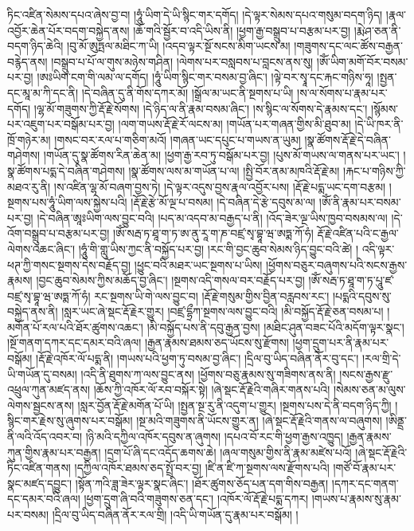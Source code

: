 ཏིང་འཛིན་སེམས་དཔའ་ཞེས་བྱ་བ། །ཧཱུཾ་ཡིག་དེ་ཡི་སྙིང་གར་དགོད། །དེ་ལྟར་སེམས་དཔའ་གསུམ་བདག་ཉིད། །རྣལ་འབྱོར་ཆེན་པོར་བདག་བསྐྱེད་ནས། །ཆོ་གའི་སྦྱོར་བ་འདི་ཡིས་ནི། །ཕྱག་རྒྱ་བསྒྲུབ་པ་བརྩམ་པར་བྱ། །རྨེ་ཤ་ཅན་ནི་བདག་ཉིད་ཆེའི། །བུ་མོ་ཨུཏྤལ་མཐིང་ཀ་ཡི། །འདབ་ལྟར་སྔོ་སངས་མིག་ཡངས་མ། །གཟུགས་དང་ལང་ཚོས་བརྒྱན་བརྙེད་ནས། །བསྒྲུབ་པ་པོ་ལ་གུས་མཉེས་གཤིན། །ལེགས་པར་བསླབས་པ་བླངས་ནས་སུ། །ཨོཾ་ཡིག་མགོ་བོར་བསམ་པར་བྱ། །ཨཿཡིག་ངག་གི་ལམ་ལ་དགོད། །ཧཱུཾ་ཡིག་སྙིང་གར་བསམ་བྱ་ཞིང་། །ལྟེ་བར་སྭཱ་དང་རྐང་གཉིས་ཧཱ། །སྤྱན་དང་མཱ་མ་ཀི་དང་ནི། །དེ་བཞིན་དུ་ནི་གོས་དཀར་མོ། །སྒྲོལ་མ་ཡང་ནི་སྔགས་པ་ཡི། །ས་ལ་སོགས་པ་རྣམ་པར་དགོད། །ལྷ་མོ་གཟུགས་ཀྱི་རྡོ་རྗེ་སོགས། །དེ་ཉིད་ལ་ནི་རྣམ་བསམ་ཞིང་། །ས་སྙིང་ལ་སོགས་དེ་རྣམས་དང་། །སྙོམས་པར་འཇུག་པར་བསྒོམ་པར་བྱ། །ལག་གཡས་རྡོ་རྗེ་རོ་ལངས་མ། །གཡོན་པར་གཞན་གྱིས་མི་ཐུབ་མ། །དེ་ཡི་ཁར་ནི་ཁྲོ་གཉེར་མ། །གསང་བར་རལ་པ་གཅིག་མའོ། །གཞན་ཡང་དཔུང་པ་གཡས་ན་ཡུམ། །སྣ་ཚོགས་རྡོ་རྗེ་དེ་བཞིན་གཤེགས། །གཡོན་དུ་སྣ་ཚོགས་རིན་ཆེན་མ། །ཕྱག་རྒྱ་རབ་ཏུ་བསྒོམ་པར་བྱ། །པུས་མོ་གཡས་ལ་གནས་པར་ཡང་། །སྣ་ཚོགས་པདྨ་དེ་བཞིན་གཤེགས། །སྣ་ཚོགས་ལས་མ་གཡོན་པ་ལ། །སྤྱི་བོར་ནམ་མཁའི་རྡོ་རྗེ་མ། །རྐང་པ་གཉིས་ཀྱི་མཐའ་རུ་ནི། །ས་འཛིན་ལྷ་མོ་བཞག་བྱས་ཏེ། །དེ་ལྟར་འདུས་བྱས་རྣལ་འབྱོར་པས། །རྡོ་རྗེ་པདྨ་ཡང་དག་བརྩམ། །སྔགས་པས་ཧཱུཾ་ཡིག་ལས་སྐྱེས་པའི། །རྡོ་རྗེ་རྩེ་མོ་ལྔ་པ་བསམ། །དེ་བཞིན་དེ་རྩེ་དབུས་མ་ལ། །ཨོཾ་ནི་རྣམ་པར་བསམ་པར་བྱ། །དེ་བཞིན་ཨཱཿཡིག་ལས་བྱུང་བའི། །པད་མ་འདབ་མ་བརྒྱད་པ་ནི། །འོད་ཟེར་ལྔ་ཡིས་ཁྱབ་བསམས་ལ། །དེ་འོག་བསྒྲུབ་པ་བརྩམ་པར་བྱ། །ཨོཾ་སརྦ་ཏ་ཐཱ་ག་ཏ་ཨ་ནུ་རཱ་ག་ཎ་བཛྲ་སྭ་བྷཱ་ཝ་ཨཏྨ་ཀོ་ཧཾ། རྡོ་རྗེ་འཛིན་པའི་ང་རྒྱལ་ལེགས་འཆང་ཞིང་། །ཧཱུཾ་གི་གླུ་ཡིས་ཀྱང་ནི་བསྐྱོད་པར་བྱ། །རང་གི་བྱང་ཆུབ་སེམས་ཉིད་བྱུང་བའི་ཚེ། །
འདི་ལྟར་ཕཊ་ཀྱི་གསང་སྔགས་དེས་བརྗོད་བྱ། །ཕྱུང་བའི་མཐར་ཡང་སྔགས་པ་ཡིས། །ཕྱོགས་བཅུར་བཞུགས་པའི་སངས་རྒྱས་རྣམས། །བྱང་ཆུབ་སེམས་ཀྱིས་མཆོད་བྱ་ཞིང་། །སྔགས་འདི་གསལ་བར་བརྗོད་པར་བྱ། །ཨོཾ་སརྦ་ཏ་ཐཱ་ག་ཏ་པཱུ་ཛ་བཛྲ་སྭ་བྷཱ་ཝ་ཨཏྨ་ཀོ་ཧཾ། རང་སྔགས་ཡི་གེ་ལས་བྱུང་བ། །རྡོ་རྗེ་གསུམ་གྱིས་བྱིན་བརླབས་རང་། །པདྨའི་དབུས་སུ་བསྐྱེད་ནས་ནི། །སླར་ཡང་ཞེ་སྡང་རྡོ་རྗེར་གྱུར། །བཛྲ་དྷྲྀཀ་སྔགས་ལས་བྱུང་བའི། །མི་བསྐྱོད་རྡོ་རྗེ་ཅན་བསམ་པ། །མགོན་པོ་རལ་པའི་ཐོར་ཚུགས་འཆང་། །མི་བསྐྱོད་པས་ནི་དབུ་རྒྱན་བྱས། །མཐིང་ཤུན་བཟང་པོའི་མདོག་ལྟར་སྣང་། །སྔོ་གནག་དཀར་དང་དམར་བའི་ཞལ། །རྒྱན་རྣམས་ཐམས་ཅད་ཡོངས་སུ་རྫོགས། །ཕྱག་དྲུག་པར་ནི་རྣམ་པར་བསྒོམ། །རྡོ་རྗེ་འཁོར་ལོ་པདྨ་ནི། །གཡས་པའི་ཕྱག་ཏུ་བསམ་བྱ་ཞིང་། །དྲིལ་བུ་ཡིད་བཞིན་ནོར་བུ་དང་། །རལ་གྲི་དེ་ཡི་གཡོན་དུ་བསམ། །འདི་ནི་ཐུགས་ཀ་ལས་བྱུང་ནས། །ཕྱོགས་བཅུ་རྣམས་སུ་གཟིགས་ནས་ནི། །སངས་རྒྱས་རྫུ་འཕྲུལ་ཀུན་མཛད་ནས། །ཆོས་ཀྱི་འཁོར་ལོ་རབ་བསྐོར་སྟེ། །ཞེ་སྡང་རྡོ་རྗེའི་གཞིར་གནས་པའི། །སེམས་ཅན་མ་ལུས་ལེགས་སྦྱངས་ནས། །སླར་བྱོན་རྡོ་རྗེ་མགོན་པོ་ཡི། །སྤྱན་སྔ་རུ་ནི་འདུག་པ་གྱུར། །སྔགས་པས་དེ་ནི་བདག་ཉིད་ཀྱི། །སྙིང་གར་རྗེས་སུ་ཞུགས་པར་བསྒོམ། །སྔ་མའི་གཟུགས་ནི་ཡོངས་གྱུར་ན། །ཞེ་སྡང་རྡོ་རྗེའི་གནས་ལ་བཞུགས། །ཨིནྡྲ་ནི་ལའི་འོད་འབར་བ། །ཉི་མའི་དཀྱིལ་འཁོར་དབུས་ན་ཞུགས། །དཔའ་བོ་རང་གི་ཕྱག་རྒྱས་འཁྱུད། །རྒྱན་རྣམས་ཀུན་གྱིས་རྣམ་པར་བརྒྱན། །དྲག་པོ་ཞི་དང་འདོད་ཆགས་ཆེ། །ཞལ་གསུམ་གྱིས་ནི་རྣམ་མཛེས་པའོ། །ཞེ་སྡང་རྡོ་རྗེའི་ཏིང་འཛིན་གནས། །དཀྱིལ་འཁོར་ཐམས་ཅད་སྤྲོ་བར་བྱ། །ཛི་ན་ཛི་ཀ་སྔགས་ལས་རྫོགས་པའི། །གཙོ་བོ་རྣམ་པར་སྣང་མཛད་དབྱུང་། །སྟོན་ཀའི་ཟླ་ཟེར་ལྟར་སྣང་ཞིང་། །ཐོར་ཚུགས་ཅོད་པན་དག་གིས་བརྒྱན། །དཀར་དང་གནག་དང་དམར་བའི་ཞལ། །ཕྱག་དྲུག་ཞི་བའི་གཟུགས་ཅན་དང་། །འཁོར་ལོ་རྡོ་རྗེ་པདྨ་དཀར། །གཡས་པ་རྣམས་སུ་རྣམ་པར་བསམ། །དྲིལ་བུ་ཡིད་བཞིན་ནོར་རལ་གྲི། །འདི་ཡི་གཡོན་དུ་རྣམ་པར་བསྒོམ། །
